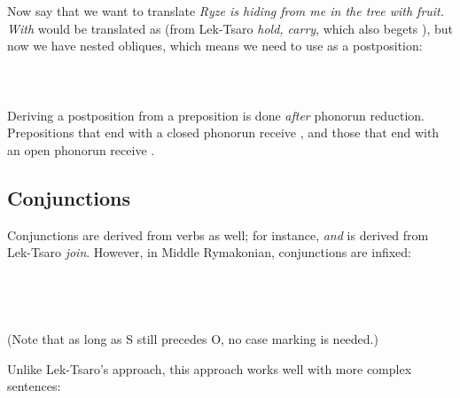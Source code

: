\documentclass{book}
\newcommand{\lname}{Middle Rymakonian}
\begin{document}
Now say that we want to translate \emph{Ryze is hiding from me in the tree with fruit.} \emph{With} would be translated as  (from Lek-Tsaro  \emph{hold, carry}, which also begets ), but now we have nested obliques, which means we need to use  as a postposition: \\
~\\
 \\
       \\

Deriving a postposition from a preposition is done \emph{after} phonorun reduction. Prepositions that end with a closed phonorun receive , and those that end with an open phonorun receive .

\subsection{Conjunctions}

Conjunctions are derived from verbs as well; for instance,  \emph{and} is derived from Lek-Tsaro  \emph{join}. However, in \lname{}, conjunctions are infixed: \\
~\\
 \\
 \\
     \\

(Note that as long as S still precedes O, no case marking is needed.)

Unlike Lek-Tsaro's approach, this approach works well with more complex sentences: \\
~\\
 \\
 \\
       \\
\end{document}
